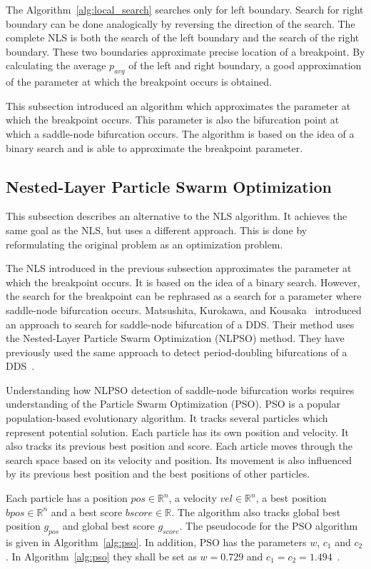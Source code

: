 \par
The Algorithm~\ref{alg:local_search} searches only for left boundary. Search for right boundary can be done analogically by reversing the direction of the search.
The complete NLS is both the search of the left boundary and the search of the right boundary.
These two boundaries approximate precise location of a breakpoint.
By calculating the average $p_{avg}$ of the left and right boundary, a good approximation of the parameter at which the breakpoint occurs is obtained.
\par
This subsection introduced an algorithm which approximates the parameter at which the breakpoint occurs.
This parameter is also the bifurcation point at which a saddle-node bifurcation occurs.
The algorithm is based on the idea of a binary search and is able to approximate the breakpoint parameter.

\subsection{Nested-Layer Particle Swarm Optimization}
This subsection describes an alternative to the NLS algorithm.
It achieves the same goal as the NLS, but uses a different approach.
This is done by reformulating the original problem as an optimization problem.
\par
The NLS introduced in the previous subsection approximates the parameter at which the breakpoint occurs.
It is based on the idea of a binary search.
However, the search for the breakpoint can be rephrased as a search for a parameter where saddle-node bifurcation occurs.
Matsushita, Kurokawa, and Kousaka~\cite{Matsushita2019} introduced an approach to search for saddle-node bifurcation of a DDS.
Their method uses the Nested-Layer Particle Swarm Optimization (NLPSO) method.
They have previously used the same approach to detect period-doubling bifurcations of a DDS~\cite{Matsushita20170721}.
\par
Understanding how NLPSO detection of saddle-node bifurcation works requires understanding of the Particle Swarm Optimization (PSO).
PSO is a popular population-based evolutionary algorithm.
It tracks several particles which represent potential solution.
Each particle has its own position and velocity. It also tracks its previous best position and score.
Each article moves through the search space based on its velocity and position.
Its movement is also influenced by its previous best position and the best positions of other particles.~\cite{Matsushita2019}
\par
Each particle has a position $pos \in \mathbb{R}^{n}$, a velocity $vel \in \mathbb{R}^{n}$, a best position $bpos \in \mathbb{R}^{n}$ and a best score $bscore \in \mathbb{R}$.
The algorithm also tracks global best position $g_{pos}$ and global best score $g_{score}$.
The pseudocode for the PSO algorithm is given in Algorithm~\ref{alg:pso}.
In addition, PSO has the parameters $w$, $c_{1}$ and $c_{2}$.
In Algorithm~\ref{alg:pso} they shall be set as $w=0.729$ and $c_{1}=c_{2}=1.494$~\cite{Matsushita2019}.

